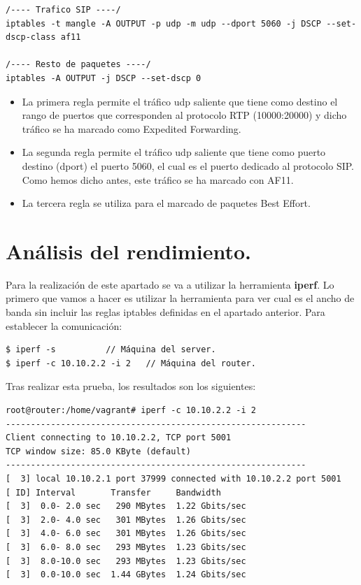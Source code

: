 \documentclass[11pt]{article}
\begin{document}
\begin{itemize}
\begin{lstlisting}[style=C,numbers=none]
/---- Trafico SIP ----/
iptables -t mangle -A OUTPUT -p udp -m udp --dport 5060 -j DSCP --set-dscp-class af11

/---- Resto de paquetes ----/
iptables -A OUTPUT -j DSCP --set-dscp 0
\end{lstlisting}
\begin{itemize}

\item La primera regla permite el tráfico udp saliente que tiene como destino el rango de puertos que corresponden al protocolo RTP (10000:20000) y dicho tráfico se ha marcado como Expedited Forwarding.


\item La segunda regla permite el tráfico udp saliente que tiene como puerto destino (dport) el puerto 5060, el cual es el puerto dedicado al protocolo SIP. Como hemos dicho antes, este tráfico se ha marcado con AF11.


\item La tercera regla se utiliza para el marcado de paquetes Best Effort.

\end{itemize}


\end{itemize}
\newpage

\section{Análisis del rendimiento.}
Para la realización de este apartado se va a utilizar la herramienta \textbf{iperf}. Lo primero que vamos a hacer es utilizar la herramienta para ver cual es el ancho de banda sin incluir las reglas iptables definidas en el apartado anterior. Para establecer la comunicación:
\begin{lstlisting}[style=C,numbers=none]
$ iperf -s 			// Máquina del server.
$ iperf -c 10.10.2.2 -i 2	// Máquina del router.
\end{lstlisting}

Tras realizar esta prueba, los resultados son los siguientes:

\begin{lstlisting}[style=C,numbers=none]
root@router:/home/vagrant# iperf -c 10.10.2.2 -i 2
------------------------------------------------------------
Client connecting to 10.10.2.2, TCP port 5001
TCP window size: 85.0 KByte (default)
------------------------------------------------------------
[  3] local 10.10.2.1 port 37999 connected with 10.10.2.2 port 5001
[ ID] Interval       Transfer     Bandwidth
[  3]  0.0- 2.0 sec   290 MBytes  1.22 Gbits/sec
[  3]  2.0- 4.0 sec   301 MBytes  1.26 Gbits/sec
[  3]  4.0- 6.0 sec   301 MBytes  1.26 Gbits/sec
[  3]  6.0- 8.0 sec   293 MBytes  1.23 Gbits/sec
[  3]  8.0-10.0 sec   293 MBytes  1.23 Gbits/sec
[  3]  0.0-10.0 sec  1.44 GBytes  1.24 Gbits/sec
\end{lstlisting}
\end{document}
